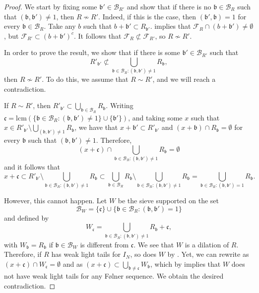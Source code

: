 \documentclass[a4paper,11pt,reqno]{amsart}
\theoremstyle{plain}
\theoremstyle{remark}
\newcommand{\cb}{\mathcal{B}}
\newcommand{\fr}{\mathcal{F}_R}
\newcommand{\frp}{\mathcal{F}_{R'}}
\newcommand{\gb}{\mathfrak{b}}
\newcommand{\gc}{\mathfrak{c}}
\begin{document}
		\begin{proof}
			We start by fixing some $\gb' \in \cb_{R'}$ and show that if there is no $\gb \in \cb_R$ such that $(\gb,\gb') \neq 1$, then $R \not \sim R'$. Indeed, if this is the case, then $(\gb',\gb)  =1$ for every $\gb \in \cb_R$. Take any $b$ such that $b+\gb' \subset R_{\gb'}$.   implies that $\fr \cap (b+\gb')  \neq \emptyset$, but $\frp \subset (b+\gb')^c$. It follows that $\fr \not\subset \frp$, so $R \not \sim R'.$
			
			
			In order to prove the result, we show that if there is some $\gb' \in \cb_{R'}$ such that  $$R'_{\gb'} \not \subset \bigcup_{\gb \in \cb_{R}:(\gb,\gb') \neq 1} R_{\gb}, $$ then $R \not \sim R'$. To do  this, we  assume that $R \sim R'$, and we will reach a contradiction. 
			
			
			
			If $R \sim R'$, then $R'_{\gb'} \subset \bigcup_{\gb\in \cb_R }  R_\gb$. Writing $\gc = \text{lcm}(\{\gb \in \cb_R: (\gb,\gb') \neq 1 \}\cup\{\gb'\})$, and taking some $x$ such that $x \in R'_{\gb'} \setminus\bigcup_{(\gb,\gb') \neq 1} R_{\gb} $, we have that $x+\gb' \subset R'_{\gb'}$ and $(x + \gb)\cap  R_\gb = \emptyset$ for every $\gb$ such that $(\gb,\gb') \neq 1$. Therefore, \begin{equation}
				\label{eq: help lemma aux for Characterization of equivalent sieves 1}
				(x+\gc) \cap \bigcup_{\gb\in \cb_R:(\gb,\gb') \neq 1} R_{\gb} = \emptyset
			\end{equation}
			and it follows that
			\begin{equation}
				\label{eq: help lemma aux for Characterization of equivalent sieves 2}
				x+\gc \subset R'_{\gb'} \setminus \bigcup_{\gb\in \cb_R:(\gb,\gb') \neq 1} R_{\gb} \subset \bigcup_{\gb \in \cb_R}  R_{\gb} \setminus \bigcup_{\gb\in \cb_R:(\gb,\gb') \neq 1} R_{\gb} = \bigcup_{\gb\in \cb_R:(\gb,\gb') = 1   }  R_\gb.
			\end{equation}
			
			
			However, this cannot happen. Let $W$ be the sieve supported on the set $$\cb_W = \{\gc\} \cup \{\gb \in \cb_R: (\gb,\gb') = 1 \}$$ and defined by $$W_\gc = \bigcup_{\gb\in \cb_R:(\gb,\gb') \neq 1   }  R_\gb + \gc,$$ with $W_\gb = R_\gb$ if $\gb\in \cb_W$ is different from $\gc$. We see that $W$ is a dilation of $R$. Therefore, if $R$ has weak light tails for $I_N$, so does $W$ by  . Yet, we can rewrite  as $(x+\gc) \cap W_\gc = \emptyset$ and  as  $(x+\gc) \subset \bigcup_{\gb \neq \gc} W_\gb$, which by  implies that $W$ does not have weak light tails for any Følner sequence. We obtain the desired contradiction.	
		\end{proof}
		
\end{document}
